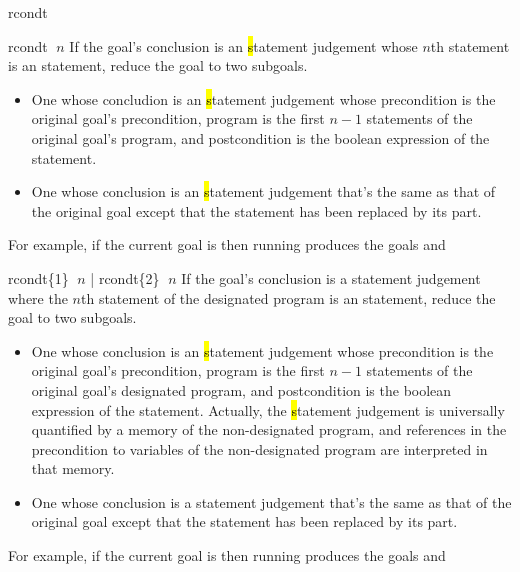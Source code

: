 \begin{tactic}{rcondt}
  \begin{tsyntax}{rcondt $\;n$}
    If the goal's conclusion is an \hl statement judgement whose $n$th
    statement is an  statement, reduce the goal to two
    subgoals.
    \begin{itemize}
    \item One whose concludion is an \hl statement judgement whose
      precondition is the original goal's precondition, program is the
      first $n-1$ statements of the original goal's program, and
      postcondition is the boolean expression of the 
      statement.
   
    \item One whose conclusion is an \hl statement judgement that's
      the same as that of the original goal except that the 
      statement has been replaced by its  part.
    \end{itemize}

    \medskip For example, if the current goal is
     then
    running 
    produces the goals
     and
  \end{tsyntax}

  \begin{tsyntax}{rcondt\{1\} $\;n$ | rcondt\{2\} $\;n$}
    If the goal's conclusion is a \prhl statement judgement where the
    $n$th statement of the designated program is an  statement,
    reduce the goal to two subgoals.
    \begin{itemize}
    \item One whose conclusion is an \hl statement judgement whose
      precondition is the original goal's precondition, program is the
      first $n-1$ statements of the original goal's designated
      program, and postcondition is the boolean expression of the
       statement. Actually, the \hl statement judgement is
      universally quantified by a memory of the non-designated
      program, and references in the precondition to variables of the
      non-designated program are interpreted in that memory.
   
    \item One whose conclusion is a \prhl statement judgement that's
      the same as that of the original goal except that the 
      statement has been replaced by its  part.
    \end{itemize}

  \medskip
  For example, if the current goal is
   then
  running 
  produces the goals
  and
  \end{tsyntax}
\end{tactic}
